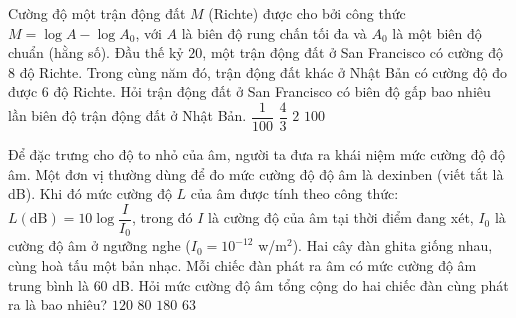\begin{ex}%
	Cường độ một trận động đất $M$ (Richte) được cho bởi công thức $M  = \log A - \log A_0$, với $A$ là biên độ rung chấn tối đa và $A_0$ là một biên độ chuẩn (hằng số). Đầu thế kỷ $20$, một trận động đất ở San Francisco có cường độ $8$ độ Richte. Trong cùng năm đó, trận động đất khác ở Nhật Bản có cường độ đo được $6$ độ Richte. Hỏi trận động đất ở San Francisco có biên độ gấp bao nhiêu lần biên độ trận động đất ở Nhật Bản.
	 \choice
		{$\dfrac{1}{100}$} 
		 {$\dfrac{4}{3}$}
		 {$2$}
		{\True $100$} 
\end{ex}

\begin{ex}%
	Để đặc trưng cho độ to nhỏ của âm, người ta đưa ra khái niệm mức cường độ độ âm. Một đơn vị thường dùng để đo mức cường độ độ âm là dexinben (viết tắt là dB). Khi đó mức cường độ $L$ của âm được tính theo công thức: $L(\text{dB}) = 10\log\dfrac{I}{I_0}$, trong đó $I$ là cường độ của âm tại thời điểm đang xét, $I_0$ là cường độ âm ở ngưỡng nghe ($I_0 = 10^{-12}$ w/m$^2$). Hai cây đàn ghita giống nhau, cùng hoà tấu một  bản nhạc. Mỗi chiếc đàn phát ra âm có mức cường độ âm trung bình là $60$ dB. Hỏi mức cường độ âm tổng cộng do hai chiếc đàn cùng phát ra là bao nhiêu?
	 \choice
		{$120$} 
		 {$80$}
		 {$180$}
		 {\True $63$}
\end{ex}

